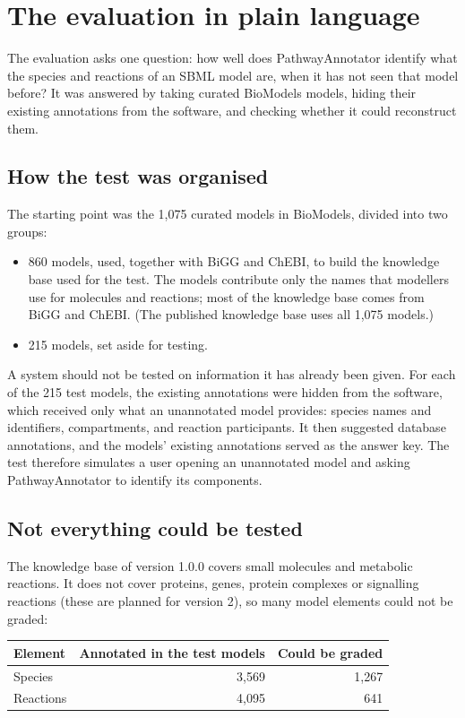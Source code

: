 \documentclass[10pt]{article}
\begin{document}
\section{The evaluation in plain language}
The evaluation asks one question: how well does PathwayAnnotator identify what the species and reactions of
an SBML model are, when it has not seen that model before? It was answered by taking curated BioModels models,
hiding their existing annotations from the software, and checking whether it could reconstruct them.

\subsection*{How the test was organised}
The starting point was the 1,075 curated models in BioModels, divided into two groups:
\begin{itemize}\itemsep0pt
\item 860 models, used, together with BiGG and ChEBI, to build the knowledge base used for the test. The
  models contribute only the names that modellers use for molecules and reactions; most of the knowledge base
  comes from BiGG and ChEBI. (The published knowledge base uses all 1,075 models.)
\item 215 models, set aside for testing.
\end{itemize}
A system should not be tested on information it has already been given. For each of the 215 test models, the
existing annotations were hidden from the software, which received only what an unannotated model provides:
species names and identifiers, compartments, and reaction participants. It then suggested database
annotations, and the models' existing annotations served as the answer key. The test therefore simulates a
user opening an unannotated model and asking PathwayAnnotator to identify its components.

\subsection*{Not everything could be tested}
The knowledge base of version 1.0.0 covers small molecules and metabolic reactions. It does not cover
proteins, genes, protein complexes or signalling reactions (these are planned for version 2), so many model
elements could not be graded:

\begin{center}\small
\begin{tabular}{lrr}
\toprule
Element & Annotated in the test models & Could be graded \\
\midrule
Species & 3,569 & 1,267 \\
Reactions & 4,095 & 641 \\
\bottomrule
\end{tabular}
\end{center}
\end{document}
